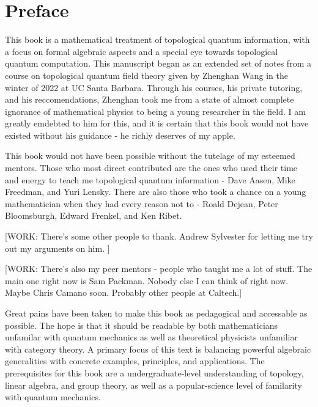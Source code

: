 \section{Preface}
\label{Preface}

This book is a mathematical treatment of topological quantum information, with a focus on formal algebraic aspects and a special eye towards topological quantum computation. This manuscript began as an extended set of notes from a course on topological quantum field theory given by Zhenghan Wang in the winter of 2022 at UC Santa Barbara. Through his courses, his private tutoring, and his reccomendations, Zhenghan took me from a state of almost complete ignorance of mathematical physics to being a young researcher in the field. I am greatly emdebted to him for this, and it is certain that this book would not have existed without his guidance - he richly deserves of my apple.

This book would not have been possible without the tutelage of my esteemed mentors. Those who most direct contributed are the ones who used their time and energy to teach me topological quantum information - Dave Aasen, Mike Freedman, and Yuri Lensky. There are also those who took a chance on a young mathematician when they had every reason not to - Roald Dejean, Peter Bloomsburgh, Edward Frenkel, and Ken Ribet.

[WORK: There's some other people to thank. Andrew Sylvester for letting me try out my arguments on him. ]

[WORK: There's also my peer mentors - people who taught me a lot of stuff. The main one right now is Sam Packman. Nobody else I can think of right now. Maybe Chris Camano soon. Probably other people at Caltech.]

Great pains have been taken to make this book as pedagogical and accessable as possible. The hope is that it should be readable by both mathematicians unfamilar with quantum mechanics as well as theoretical physicists unfamiliar with category theory. A primary focus of this text is balancing powerful algebraic generalities with concrete examples, principles, and applications. The prerequisites for this book are a undergraduate-level understanding of topology, linear algebra, and group theory, as well as a popular-science level of familarity with quantum mechanics.

